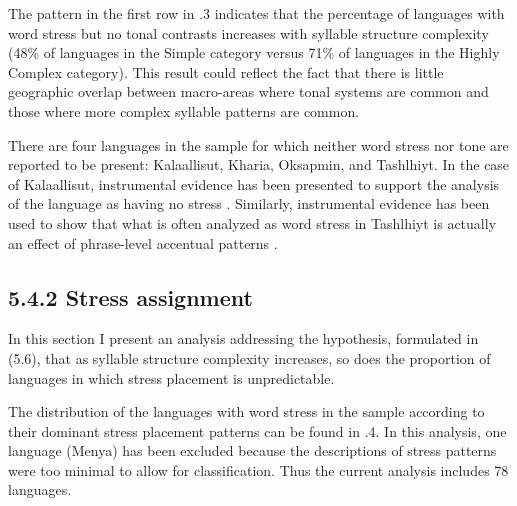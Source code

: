   The pattern in the first row in .3 indicates that the percentage of languages with word stress but no tonal contrasts increases with syllable structure complexity (48\% of languages in the Simple category versus 71\% of languages in the Highly Complex category). This result could reflect the fact that there is little geographic overlap between macro-areas where tonal systems are common and those where more complex syllable patterns are common.

  There are four languages in the sample for which neither word stress nor tone are reported to be present: Kalaallisut, Kharia, Oksapmin, and Tashlhiyt. In the case of Kalaallisut, instrumental evidence has been presented to support the analysis of the language as having no stress \citep{Jacobsen2000}. Similarly, instrumental evidence has been used to show that what is often analyzed as word stress in Tashlhiyt is actually an effect of phrase-level accentual patterns \citep{RoettgerEtAl2015}.

\subsection{5.4.2 Stress assignment}

  In this section I present an analysis addressing the hypothesis, formulated in (5.6), that as syllable structure complexity increases, so does the proportion of languages in which stress placement is unpredictable.

  The distribution of the languages with word stress in the sample according to their dominant stress placement patterns can be found in .4. In this analysis, one language (Menya) has been excluded because the descriptions of stress patterns were too minimal to allow for classification. Thus the current analysis includes 78 languages.

